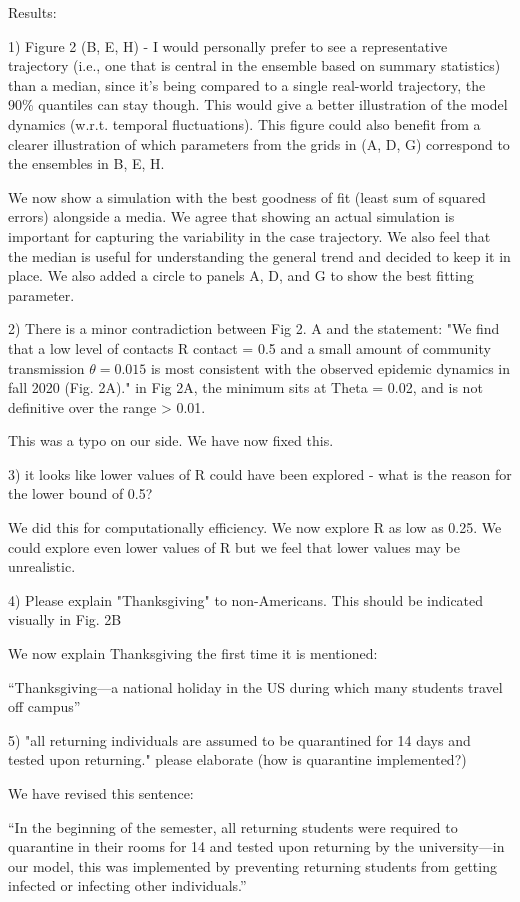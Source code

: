 \documentclass[12pt]{article}
\newcommand{\revtext}{\textsf}
\begin{document}
\revtext{Results:}

\revtext{1) Figure 2 (B, E, H) - I would personally prefer to see a representative trajectory (i.e., one that is central in the ensemble based on summary statistics) than a median, since it's being compared to a single real-world trajectory, the 90\% quantiles can stay though. This would give a better illustration of the model dynamics (w.r.t. temporal fluctuations). 
This figure could also benefit from a clearer illustration of which parameters from the grids in (A, D, G) correspond to the ensembles in B, E, H.}

We now show a simulation with the best goodness of fit (least sum of squared errors) alongside a media. 
We agree that showing an actual simulation is important for capturing the variability in the case trajectory.
We also feel that the median is useful for understanding the general trend and decided to keep it in place.
We also added a circle to panels A, D, and G to show the best fitting parameter.

\revtext{2) There is a minor contradiction between Fig 2. A and the statement: "We find that a low level of contacts R contact = 0.5 and a small amount of community transmission $\theta = 0.015$ is most consistent with the observed epidemic dynamics in fall 2020 (Fig. 2A)." in Fig 2A, the minimum sits at Theta = 0.02, and is not definitive over the range > 0.01.}

This was a typo on our side. We have now fixed this.

\revtext{3) it looks like lower values of R could have been explored - what is the reason for the lower bound of 0.5?}

We did this for computationally efficiency. We now explore R as low as 0.25.
We could explore even lower values of R but we feel that lower values may be unrealistic.

\revtext{4) Please explain "Thanksgiving" to non-Americans. This should be indicated visually in Fig. 2B}

We now explain Thanksgiving the first time it is mentioned:

``Thanksgiving---a national holiday in the US during which many students travel off campus''

\revtext{5) "all returning individuals are assumed to be quarantined for 14 days and tested upon returning." please elaborate (how is quarantine implemented?)}

We have revised this sentence:

``In the beginning of the semester, all returning students were required to quarantine in their rooms for 14 and tested upon returning by the university---in our model, this was implemented by preventing returning students from getting infected or infecting other individuals.''
\end{document}
